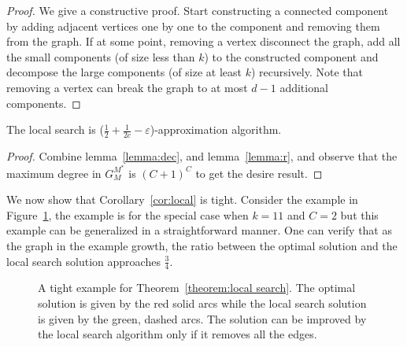 \begin{proof}
We give a constructive proof.  Start constructing a connected
component by adding adjacent vertices one by one to the component and
removing them from the graph.  If at some point, removing a vertex
disconnect the graph, add all the small components (of size less than
$k$) to the constructed component and decompose the large components
(of size at least $k$) recursively.  Note that removing a vertex can
break the graph to at most $d - 1$ additional components.
\end{proof}

\begin{theorem}
\label{theorem:local search}
The local search is ($\frac{1}{2} + \frac{1}{2c}
- \varepsilon$)-approximation algorithm.
\end{theorem}

\begin{proof}
Combine lemma~\ref{lemma:dec}, and lemma~\ref{lemma:r}, and observe
that the maximum degree in $G^{M^*}_M$ is $(C + 1)^C$ to get the
desire result.
\end{proof}

\fi %



We now show that Corollary~\ref{cor:local} is tight.  Consider the
example in Figure~\ref{fig:local search tight}, the example is for the
special case when $k=11$ and $C=2$ but this example can be generalized
in a straightforward manner.  One can verify that as the graph in the
example growth, the ratio between the optimal solution and the local
search solution approaches $\frac{3}{4}$.

\begin{figure}
\begin{center}

\caption{A tight example for Theorem~\ref{theorem:local search}. 
The optimal solution is given by the red solid arcs while the local
search solution is given by the green, dashed arcs.  The solution can
be improved by the local search algorithm only if it removes all the
edges.}
\label{fig:local search tight}
\end{center}
\end{figure}


